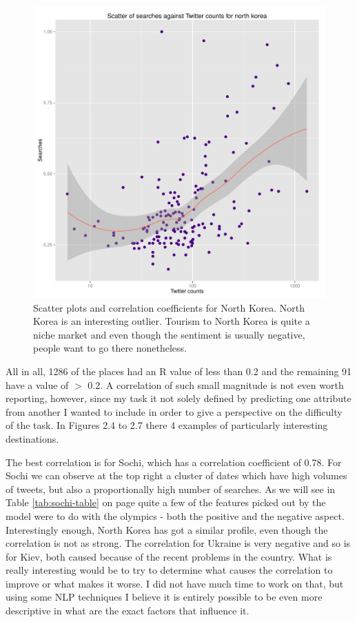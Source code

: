 \documentclass[minf,twoside,singlespacing,parskip,frontabs]{infthesis}
\begin{document}
\begin{figure}[]
\includegraphics[scale=0.65]{north-korea}
\caption{Scatter plots and correlation coefficients for North Korea. North Korea is an interesting outlier. Tourism to North Korea is quite a niche market and even though the sentiment is usually negative, people want to go there nonetheless.  }
\end{figure}


All in all, 1286 of the places had an R value of less than 0.2 and the remaining 91 have a value of $>$ 0.2. A correlation of such small magnitude is not even worth reporting, however, since my task it not solely defined by predicting one attribute from another I wanted to include in order to give a perspective on the difficulty of the task. In Figures 2.4 to 2.7 there 4 examples of particularly interesting destinations. 


The best correlation is for Sochi, which has a correlation coefficient of 0.78. For Sochi we can observe at the top right a cluster of dates which have high volumes of tweets, but also a proportionally high number of searches. As we will see in Table \ref{tab:sochi-table} on page \pageref{tab:sochi-table} quite a few of the features picked out by the model were to do with the olympics - both the positive and the negative aspect. Interestingly enough, North Korea has got a similar profile, even though the correlation is not as strong. The correlation for Ukraine is very negative and so is for Kiev, both caused because of the recent problems in the country. What is really interesting would be to try to determine what causes the correlation to improve or what makes it worse. I did not have much time to work on that, but using some NLP techniques I believe it is entirely possible to be even more descriptive in what are the exact factors that influence it.
\end{document}
